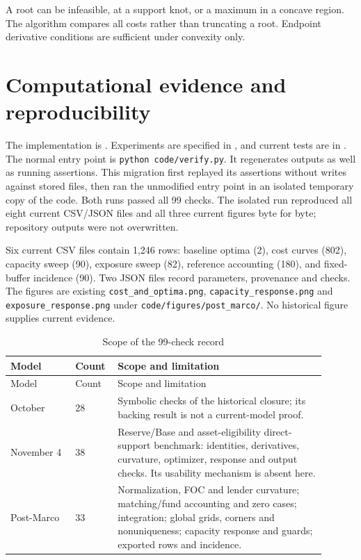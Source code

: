 \documentclass[11pt]{article}
\theoremstyle{definition}
\begin{document}
A root can be infeasible, at a support knot, or a maximum in a concave region. The algorithm compares all costs rather than truncating a root. Endpoint derivative conditions are sufficient under convexity only.

\section{Computational evidence and reproducibility}\label{app:verification}
The implementation is . Experiments are specified in , and current tests are in . The normal entry point is \texttt{python code/verify.py}. It regenerates outputs as well as running assertions. This migration first replayed its assertions without writes against stored files, then ran the unmodified entry point in an isolated temporary copy of the code. Both runs passed all 99 checks. The isolated run reproduced all eight current CSV/JSON files and all three current figures byte for byte; repository outputs were not overwritten.

Six current CSV files contain 1,246 rows: baseline optima (2), cost curves (802), capacity sweep (90), exposure sweep (82), reference accounting (180), and fixed-buffer incidence (90). Two JSON files record parameters, provenance and checks. The figures are existing \texttt{cost\_and\_optima.png}, \texttt{capacity\_response.png} and \texttt{exposure\_response.png} under \texttt{code/figures/post\_marco/}. No historical figure supplies current evidence.

\begin{longtable}{P{0.19\linewidth}P{0.10\linewidth}P{0.61\linewidth}}
\caption{Scope of the 99-check record}\\
\toprule Model & Count & Scope and limitation\\ \midrule
\endfirsthead
\toprule Model & Count & Scope and limitation\\ \midrule
\endhead
October & 28 & Symbolic checks of the historical closure; its backing result is not a current-model proof.\\
November 4 & 38 & Reserve/Base and asset-eligibility direct-support benchmark: identities, derivatives, curvature, optimizer, response and output checks. Its usability mechanism is absent here.\\
Post-Marco & 33 & Normalization, FOC and lender curvature; matching/fund accounting and zero cases; integration; global grids, corners and nonuniqueness; capacity response and guards; exported rows and incidence.\\
\bottomrule
\end{longtable}
\end{document}
